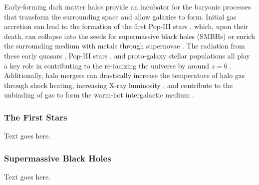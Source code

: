Early-forming dark matter halos provide an incubator for the baryonic processes that transform the surrounding space and allow galaxies to form.  Initial gas accretion can lead to the formation of the first Pop-III stars \citep{1986MNRAS.221...53C, 1997ApJ...474....1T, 2000ApJ...540...39A, 2002Sci...295...93A}, which, upon their death, can collapse into the seeds for supermassive black holes (SMBHs) \citep{2001ApJ...551L..27M, 2003MNRAS.340..647I, 2009ApJ...701L.133A, 2012ApJ...754...34J} or enrich the surrounding medium with metals through supernovae \citep{2002ApJ...567..532H, 2003ApJ...591..288H}.  The radiation from these early quasars \citep{1987ApJ...321L.107S, 1999ApJ...514..648M, 2001AJ....122.2833F}, Pop-III stars \citep{1997ApJ...486..581G, 2003ApJ...584..621V, 2006ApJ...639..621A}, and proto-galaxy stellar populations \citep{2012ApJ...752L...5B, 2012MNRAS.423..862K} all play a key role in contributing to the re-ionizing the universe by around $z = 6$ \citep{2001PhR...349..125B}.  Additionally, halo mergers can drastically increase the temperature of halo gas through shock heating, increasing X-ray luminosity \citep{2009MNRAS.397..190S}, and contribute to the unbinding of gas to form the warm-hot intergalactic medium \citep{2008SSRv..134..141B, 2010MNRAS.405L..31S, 2012MNRAS.425.2974T}.



\subsubsection{The First Stars}
\label{subsubsec:early_universe--baryonic_processes--first_stars}


Text goes here.



\subsubsection{Supermassive Black Holes}
\label{subsubsec:early_universe--baryonic_processes--smbhs}


Text goes here.



